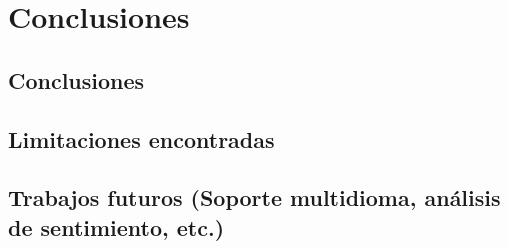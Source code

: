 \chapter{\textbf{Conclusiones}}
\label{ch:concl}
\thispagestyle{fancy} 

\section{Conclusiones}
\label{sec:conclusiones_finales}

\textoBase

\section{Limitaciones encontradas}
\label{sec:limitaciones}

\textoBaseAlt

\section{Trabajos futuros (Soporte multidioma, análisis de sentimiento, etc.)}
\label{sec:trabajos_futuros}

\textoBase

